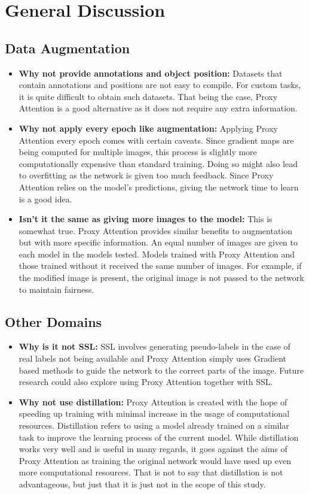 \documentclass[a4paper,11pt,openright]{book}
\begin{document}
\section{General Discussion} 
\subsection{Data Augmentation}
\begin{itemize}
    \item \textbf{Why not provide annotations and object position: }Datasets that contain annotations and positions are not easy to compile. For custom tasks, it is quite difficult to obtain such datasets. That being the case, Proxy Attention is a good alternative as it does not require any extra information.

    \item \textbf{Why not apply every epoch like augmentation: } Applying Proxy Attention every epoch comes with certain caveats. Since gradient maps are being computed for multiple images, this process is slightly more computationally expensive than standard training. Doing so might also lead to overfitting as the network is given too much feedback. Since Proxy Attention relies on the model's predictions, giving the network time to learn is a good idea.

    \item \textbf{Isn't it the same as giving more images to the model: } This is somewhat true. Proxy Attention provides similar benefits to augmentation but with more specific information. An equal number of images are given to each model in the models tested. Models trained with Proxy Attention and those trained without it received the same number of images. For example, if the modified image is present, the original image is not passed to the network to maintain fairness.
\end{itemize}

\subsection{Other Domains}
\begin{itemize}
\item \textbf{Why is it not SSL:} SSL involves generating pseudo-labels in the case of real labels not being available and Proxy Attention simply uses Gradient based methods to guide the network to the correct parts of the image. Future research could also explore using Proxy Attention together with SSL.
\item \textbf{Why not use distillation:} Proxy Attention is created with the hope of speeding up training with minimal increase in the usage of computational resources. Distillation refers to using a model already trained on a similar task to improve the learning process of the current model. While distillation works very well and is useful in many regards, it goes against the aims of Proxy Attention as training the original network would have used up even more computational resources. That is not to say that distillation is not advantageous, but just that it is just not in the scope of this study.
\end{itemize}
\end{document}
